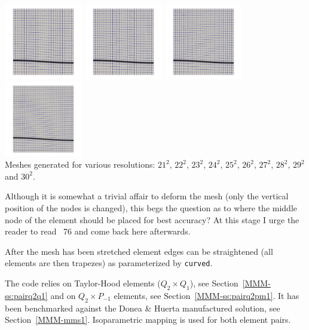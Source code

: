 \begin{center}
\includegraphics[width=3.42cm]{python_codes/fieldstone_25/images/mesh.0006.jpg}
\includegraphics[width=3.42cm]{python_codes/fieldstone_25/images/mesh.0007.jpg}
\includegraphics[width=3.42cm]{python_codes/fieldstone_25/images/mesh.0008.jpg}
\includegraphics[width=3.42cm]{python_codes/fieldstone_25/images/mesh.0009.jpg}\\
{\captionfont Meshes generated for various resolutions: $21^2$, $22^2$, $23^2$, 
$24^2$, $25^2$, $26^2$, $27^2$, $28^2$, $29^2$ and $30^2$.}
\end{center}

Although it is somewhat a trivial affair to deform the mesh (only the vertical 
position of the nodes is changed), this begs the question as to where the middle node
of the element should be placed for best accuracy?
At this stage I urge the reader to read \stone~76 and come back here afterwards. 

After the mesh has been stretched element edges can be straightened 
(all elements are then trapezes) as parameterized by \lstinline{curved}.  

The code relies on Taylor-Hood elements ($Q_2\times Q_1$), see Section~\ref{MMM-ss:pairq2q1} and 
on $Q_2\times P_{-1}$ elements, see Section~\ref{MMM-ss:pairq2pm1}. 
It has been  benchmarked against the Donea \& Huerta manufactured solution, see Section~\ref{MMM-mms1}.
Isoparametric mapping is used for both element pairs.

